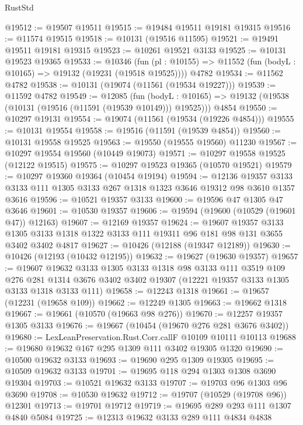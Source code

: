 \begin{lexlean}{RustStd}
\begin{coremodule}
@19512 := @19507 @19511
@19515 := @19484 @19511 @19181 @19315
@19516 := @11574 @19515
@19518 := @10131 (@19516 @11595)
@19521 := @19491 @19511 @19181 @19315
@19523 := @10261 @19521 @3133
@19525 := @10131 @19523 @19365
@19533 := @10346
    (fun (pl : @10155) => @11552 (fun (bodyL : @10165) => @19132 (@19231 (@19518 @19525))))
    @4782
@19534 := @11562 @4782
@19538 := @10131 (@19074 (@11561 (@19534 @19227)))
@19539 := @11592 @4782
@19549 := @12085
    (fun (bodyL : @10165) => @19132 (@19538 (@10131 (@19516 (@11591 (@19539 @10149))) @19525)))
    @4854
@19550 := @10297 @19131
@19554 := @19074 (@11561 (@19534 (@19226 @4854)))
@19555 := @10131 @19554
@19558 := @19516 (@11591 (@19539 @4854))
@19560 := @10131 @19558 @19525
@19563 := @19550 (@19555 @19560) @11230
@19567 := @10297 @19554 @19560 (@10449 @19073)
@19571 := @10297 @19558 @19525 (@12122 @19515)
@19575 := @10297 @19523 @19365 (@10570 @19521)
@19579 := @10297 @19360 @19364 (@10454 @19194)
@19594 := @12136
    @19357
    @3133
    @3133
    @111
    @1305
    @3133
    @267
    @1318
    @1323
    @3646
    @19312
    @98
    @3610
    @1357
    @3616
@19596 := @10521 @19357 @3133
@19600 := @19596 @47 @1305 @47 @3646
@19601 := @10530 @19357
@19606 := @19594 (@19600 (@10529 (@19601 @47)) @12163)
@19607 := @12169 @19357
@19624 := @19607
    @19357
    @3133
    @1305
    @3133
    @1318
    @1322
    @3133
    @111
    @19311
    @96
    @181
    @98
    @131
    @3655
    @3402
    @3402
    @4817
@19627 := @10426 (@12188 (@19347 @12189))
@19630 := @10426 (@12193 (@10432 @12195))
@19632 := @19627 (@19630 @19357)
@19657 := @19607
    @19632
    @3133
    @1305
    @3133
    @1318
    @98
    @3133
    @111
    @3519
    @109
    @276
    @281
    @1314
    @3676
    @3402
    @3402
    @19307
    (@12221 @19357 @3133 @1305 @3133 @1318 @3133 @111)
@19658 := @12243 @1318
@19661 := @19657 (@12231 (@19658 @109))
@19662 := @12249 @1305
@19663 := @19662 @1318
@19667 := @19661 (@10570 (@19663 @98 @276))
@19670 := @12257 @19357 @1305 @3133
@19676 := @19667 (@10454 (@19670 @276 @281 @3676 @3402))
@19680 := LexLeanPreservation.Rust.Corr.callF @10109 @10111 @10113
@19688 := @19680 @19632 @167 @295 @1309 @111 @3402 @19305 @1320
@19690 := @10500 @19632 @3133
@19693 := @19690 @295 @1309 @19305
@19695 := @10509 @19632 @3133
@19701 := @19695 @118 @294 @1303 @1308 @3690 @19304
@19703 := @10521 @19632 @3133
@19707 := @19703 @96 @1303 @96 @3690
@19708 := @10530 @19632
@19712 := @19707 (@10529 (@19708 @96)) @12301
@19713 := @19701 @19712
@19719 := @19695 @289 @293 @111 @1307 @4840 @5084
@19725 := @12313 @19632 @3133 @289 @111 @4834 @4838

\end{coremodule}
\end{lexlean}
